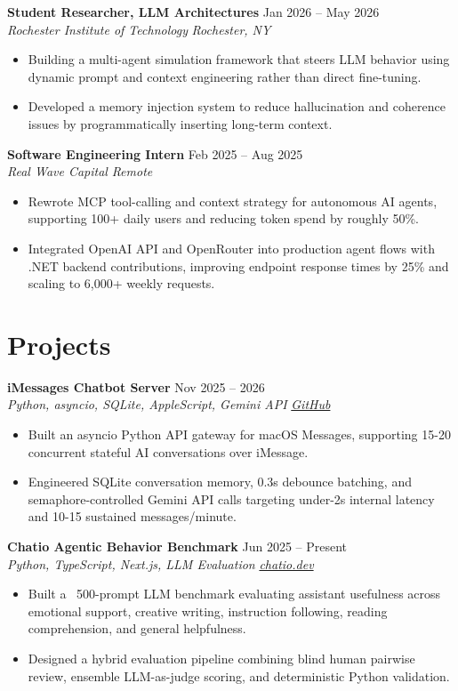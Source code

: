 \documentclass[10pt,letterpaper]{article}
\newif\ifresumeFirstRole
\newcommand{\resumeRole}[4]{%
  \ifresumeFirstRole
    \global\resumeFirstRolefalse
  \else
    \vspace{0pt plus 1fill}%
  \fi
  \textbf{#1} \hfill #2\\
  \textit{#3} \hfill \textit{#4}
}
\begin{document}
\resumeRole{Student Researcher, LLM Architectures}{Jan 2026 -- May 2026}{Rochester Institute of Technology}{Rochester, NY}
\begin{itemize}
  \item Building a multi-agent simulation framework that steers LLM behavior using dynamic prompt and context engineering rather than direct fine-tuning.
  \item Developed a memory injection system to reduce hallucination and coherence issues by programmatically inserting long-term context.
\end{itemize}

\resumeRole{Software Engineering Intern}{Feb 2025 -- Aug 2025}{Real Wave Capital}{Remote}
\begin{itemize}
  \item Rewrote MCP tool-calling and context strategy for autonomous AI agents, supporting 100+ daily users and reducing token spend by roughly 50\%.
  \item Integrated OpenAI API and OpenRouter into production agent flows with .NET backend contributions, improving endpoint response times by 25\% and scaling to 6,000+ weekly requests.
\end{itemize}

\section*{Projects}
\resumeRole{iMessages Chatbot Server}{Nov 2025 -- 2026}{Python, asyncio, SQLite, AppleScript, Gemini API}{\href{https://github.com/alextyhwang/iMessages-Chatbot-Server}{GitHub}}
\begin{itemize}
  \item Built an asyncio Python API gateway for macOS Messages, supporting 15-20 concurrent stateful AI conversations over iMessage.
  \item Engineered SQLite conversation memory, 0.3s debounce batching, and semaphore-controlled Gemini API calls targeting under-2s internal latency and 10-15 sustained messages/minute.
\end{itemize}

\resumeRole{Chatio Agentic Behavior Benchmark}{Jun 2025 -- Present}{Python, TypeScript, Next.js, LLM Evaluation}{\href{https://chatio.dev}{chatio.dev}}
\begin{itemize}
  \item Built a ~500-prompt LLM benchmark evaluating assistant usefulness across emotional support, creative writing, instruction following, reading comprehension, and general helpfulness.
  \item Designed a hybrid evaluation pipeline combining blind human pairwise review, ensemble LLM-as-judge scoring, and deterministic Python validation.
\end{itemize}
\end{document}
